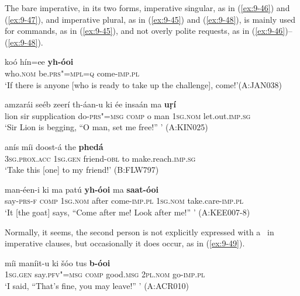 The bare imperative, in its two forms, imperative singular, as in (\ref{ex:9-46}) and (\ref{ex:9-47}), and imperative plural, as in (\ref{ex:9-45}) and (\ref{ex:9-48}), is mainly used for commands, as in (\ref{ex:9-45}), and not overly polite requests, as in (\ref{ex:9-46})--(\ref{ex:9-48}).

\begin{exe}
\ex
\label{ex:9-45}
\gll koó hín=ee \textbf{yh-óoi}\\
who.\textsc{nom} be.\textsc{prs"=mpl=q} come-\textsc{imp.pl}\\
\glt `If there is anyone [who is ready to take up the challenge], come!'\newline (A:JAN038)

\ex
\label{ex:9-46}
\gll amzarái seéb zeerí th-áan-u ki ée insaán ma \textbf{uṛí}\\
lion sir supplication do-\textsc{prs"=msg} \textsc{comp} o man \textsc{1sg.nom} let.out.\textsc{imp.sg}\\
\glt `Sir Lion is begging, ``O man, set me free!'' ' (A:KIN025)

\ex
\label{ex:9-47}
\gll anís míi doost-á the \textbf{phedá} \\
\textsc{3sg.prox.acc} \textsc{1sg.gen} friend-\textsc{obl} to make.reach.\textsc{imp.sg}\\
\glt `Take this [one] to my friend!' (B:FLW797)

\ex
\label{ex:9-48}
\gll man-éen-i ki ma patú \textbf{yh-óoi} ma \textbf{saat-óoi} \\
say-\textsc{prs-f} \textsc{comp} \textsc{1sg.nom} after come-\textsc{imp.pl} \textsc{1sg.nom} take.care-\textsc{imp.pl} \\
\glt `It [the goat] says, ``Come after me! Look after me!'' ' (A:KEE007-8)
\end{exe}

Normally, it seems, the second person is not explicitly expressed with a~ in imperative clauses, but occasionally it does occur, as in (\ref{ex:9-49}).

\begin{exe}
\ex
\label{ex:9-49}
\gll míi maníit-u ki šóo tus \textbf{b-óoi} \\
\textsc{1sg.gen} say.\textsc{pfv"=msg} \textsc{comp} good.\textsc{msg} \textsc{2pl.nom} go-\textsc{imp.pl} \\
\glt `I said, ``That's fine, you may leave!'' ' (A:ACR010)
\end{exe}

